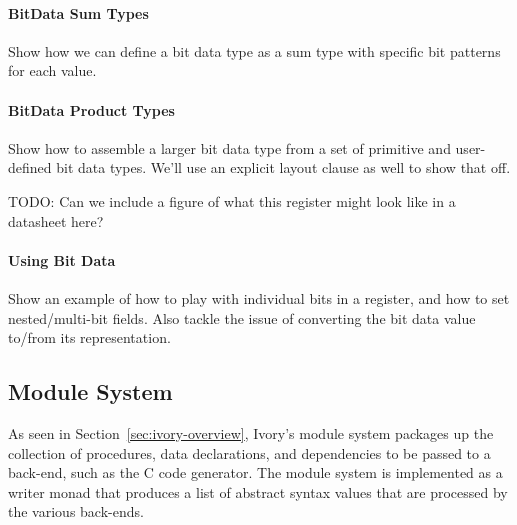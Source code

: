 \paragraph{BitData Sum Types}
Show how we can define a bit data type as a sum type with specific
bit patterns for each value.

\begin{code}
[ivory|
  bitdata BaudRate :: Bits 2
    = baud_9600    as 0b00
    | baud_19200   as 0b01
    | baud_38400   as 0b10
    -- bit pattern 0b11 is invalid
|]
\end{code}

\paragraph{BitData Product Types}
Show how to assemble a larger bit data type from a set of primitive
and user-defined bit data types.  We'll use an explicit layout clause
as well to show that off.

TODO: Can we include a figure of what this register might look like
in a datasheet here?


\begin{code}
[ivory|
  bitdata CtrlReg :: Bits 8 = ctrl_reg
    { ctrl_tx_enable  :: Bit
    , ctrl_rx_enable  :: Bit
    , ctrl_baud_rate  :: BaudRate
    } as 0b0000 # ctrl_tx_enable # ctrl_rx_enable
                # ctrl_baud_rate
|]
\end{code}

\paragraph{Using Bit Data}
Show an example of how to play with individual bits in a register, and how
to set nested/multi-bit fields. Also tackle the issue of converting the
bit data value to/from its representation.

\subsection{Module System}

As seen in Section~\ref{sec:ivory-overview}, Ivory's module system packages up
the collection of procedures, data declarations, and dependencies to be passed
to a back-end, such as the C code generator. The module system is implemented as
a writer monad that produces a list of abstract syntax values that are processed
by the various back-ends.

